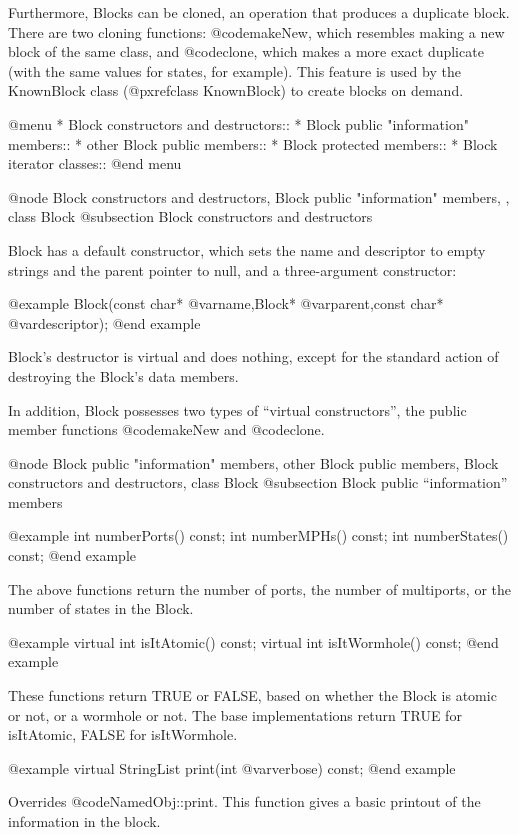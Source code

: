 Furthermore, Blocks can be cloned, an operation that produces a
duplicate block.  There are two cloning functions: @code{makeNew},
which resembles making a new block of the same class, and @code{clone},
which makes a more exact duplicate (with the same values for states,
for example).  This feature is used by the KnownBlock class
(@pxref{class KnownBlock}) to create blocks on demand.

@menu
* Block constructors and destructors::  
* Block public "information" members::  
* other Block public members::  
* Block protected members::  
* Block iterator classes::  
@end menu

@node Block constructors and destructors, Block public "information" members,  , class Block
@subsection Block constructors and destructors

Block has a default constructor, which sets the name and
descriptor to empty strings and the parent pointer to null, and a
three-argument constructor:

@example
Block(const char* @var{name},Block* @var{parent},const char* @var{descriptor});
@end example

Block's destructor is virtual and does nothing, except for the standard
action of destroying the Block's data members.

In addition, Block possesses two types of ``virtual constructors'', the
public member functions @code{makeNew} and @code{clone}.

@node Block public "information" members, other Block public members, Block constructors and destructors, class Block
@subsection Block public ``information'' members

@example
int numberPorts() const;
int numberMPHs() const;
int numberStates() const;
@end example

The above functions return the number of ports, the number of
multiports, or the number of states in the Block.

@example
virtual int isItAtomic() const;
virtual int isItWormhole() const;
@end example

These functions return TRUE or FALSE, based on whether the Block is
atomic or not, or a wormhole or not.  The base implementations return
TRUE for isItAtomic, FALSE for isItWormhole.

@example
virtual StringList print(int @var{verbose}) const;
@end example

Overrides @code{NamedObj::print}.  This function gives a basic printout of
the information in the block.

